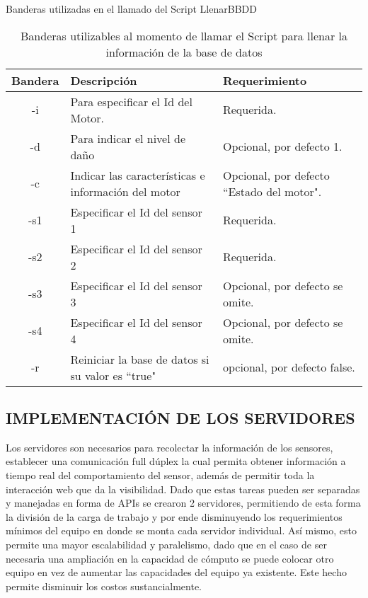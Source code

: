 \begin{table}[ht]
        \begin{center}
            Banderas utilizadas en el llamado del Script LlenarBBDD \\

            \vspace{0.3cm}
            \begin{tabular}{|c|p{7cm}|p{5cm}|}
                \hline
                Bandera & Descripción & Requerimiento \\\hline
                -i & Para especificar el Id del Motor. & Requerida.\\\hline
                -d & Para indicar el nivel de daño  & Opcional, por defecto 1.\\\hline
                -c & Indicar las características e información del motor & Opcional, por defecto ``Estado del motor".\\\hline
                -s1& Especificar el Id del sensor 1 &Requerida.\\\hline
                -s2& Especificar el Id del sensor 2 &Requerida.\\\hline
                -s3& Especificar el Id del sensor 3 & Opcional, por defecto se omite.\\\hline
                -s4& Especificar el Id del sensor 4  &Opcional, por defecto se omite.\\\hline
                -r & Reiniciar la base de datos si su valor es ``true"& opcional, por defecto false.
                \\\hline
            \end{tabular}
        \end{center}
        \caption[Banderas Script para el llenado de la BBDD]{
        Banderas utilizables al momento de llamar el Script para llenar la información
        de la base de datos}
        \label{tab:BanderasLLenadoBBDD}
    \end{table}


\subsection{IMPLEMENTACIÓN DE LOS SERVIDORES}

    Los servidores son necesarios para recolectar la información de los sensores,
    establecer una comunicación full dúplex la cual permita obtener información
    a tiempo real del comportamiento del sensor, además de permitir toda la
    interacción web que da la visibilidad. Dado que estas tareas pueden ser
    separadas y manejadas en forma de APIs se crearon 2 servidores, permitiendo
    de esta forma la división de la carga de trabajo y por ende disminuyendo los
    requerimientos mínimos del equipo en donde se monta cada servidor individual.
    Así mismo, esto permite una mayor escalabilidad y paralelismo, dado que en el
    caso de ser necesaria una ampliación en la capacidad de cómputo se puede colocar
    otro equipo en vez de aumentar las capacidades del equipo ya existente. Este
    hecho permite disminuir los costos sustancialmente.

